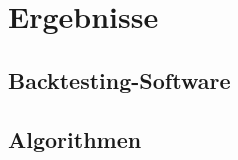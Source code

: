 
\chapter{Ergebnisse} \label{chapter:ergebnisse}

\section{Backtesting-Software}


\section{Algorithmen}


